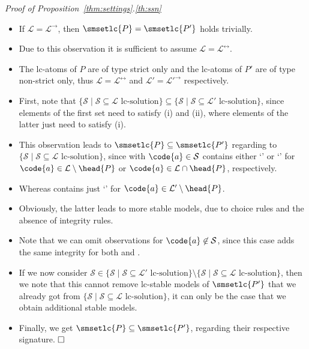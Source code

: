 \noindent\textit{Proof of Proposition~\ref{thm:settings}.\ref{th:ssn}}   
    \begin{itemize}
     \item If $\mathcal{L}=\mathcal{L}^\rightarrow$, 
        then $\smsetlc{P}=\smsetlc{P'}$ holds trivially.
     \item Due to this observation it is sufficient to assume 
        \(
        \mathcal{L}=
        \mathcal{L}^\leftrightarrow
        \). 
     \item The lc-atoms of $P$ are of type 
        strict only and 
        the lc-atoms of $P'$ are of type
        non-strict only, thus  
        \(
        \mathcal{L}=
        \mathcal{L}^\leftrightarrow
        \) 
        and
        \(
        \mathcal{L}'=
        \mathcal{L}'^\rightarrow
        \) respectively.  
     \item First, note that 
        \(
        \{\mathcal{S}\mid\mathcal{S}\subseteq\mathcal{L}\text{ lc-solution}\}\subseteq
        \{\mathcal{S}\mid\mathcal{S}\subseteq\mathcal{L}'\text{ lc-solution}\}
        \), 
        since elements of the first set need to satisfy (i) and (ii), 
        where elements of the latter just need to satisfy (i). 
     \item This observation leads to 
        \(
        \smsetlc{P}\subseteq\smsetlc{P'}
        \) 
        regarding to $\{\mathcal{S}\mid\mathcal{S}\subseteq\mathcal{L}\text{ lc-solution}\}$, 
        since  with $\code{a}\in\mathcal{S}$ 
        contains either `' or `' for 
        $\code{a}\in\mathcal{L}\setminus\head{P}$ or 
        $\code{a}\in\mathcal{L}\cap\head{P}$, respectively. 
     \item Whereas  contains just `' 
        for $\code{a}\in\mathcal{L}'\setminus\head{P}$. 
     \item Obviously, the latter leads to more stable models, 
        due to choice rules and the absence of integrity rules.
     \item Note that we can omit observations for 
        $\code{a}\not\in\mathcal{S}$, 
        since this case adds the same integrity for 
        both  and . 
     \item If we now consider 
        \(
        \mathcal{S}\in\{\mathcal{S}\mid\mathcal{S}\subseteq\mathcal{L}'\text{ lc-solution}\}\setminus
        \{\mathcal{S}\mid\mathcal{S}\subseteq\mathcal{L}\text{ lc-solution}\}
        \), 
        then we note that this cannot remove lc-stable models of 
        $\smsetlc{P'}$ that we already got from 
        \(
        \{\mathcal{S}\mid\mathcal{S}\subseteq\mathcal{L}\text{ lc-solution}\}
        \), 
        it can only be the case that we obtain additional stable models. 
     \item Finally, we get 
        \(
        \smsetlc{P}\subseteq\smsetlc{P'}
        \), 
        regarding their respective signature. 
        $\hfill\square$
    \end{itemize}

